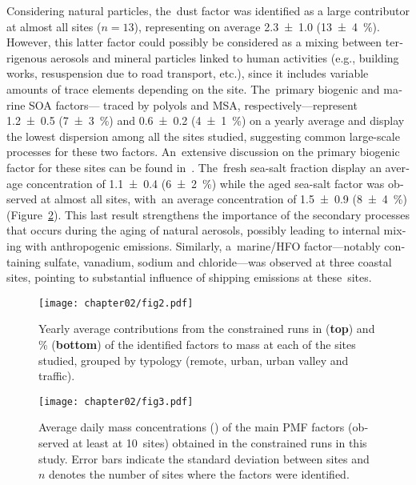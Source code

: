 \begin{otherlanguage}{english}
Considering natural particles, the~dust factor was identified as a large contributor at
almost all sites ($n=13$), representing on average \SI{2.3\pm1.0}{\concum}
(\SI{13\pm4}{\percent}). However, this latter factor could possibly be considered as a
mixing between terrigenous aerosols and mineral particles linked to human activities
(e.g., building works, resuspension due to road transport, etc.), since it includes
variable amounts of trace elements depending on the site. The~primary biogenic and marine
SOA factors--- traced by polyols and MSA, respectively---represent \SI{1.2\pm0.5}{\concum}
(\SI{7\pm3}{\%}) and \SI{0.6\pm0.2}{\concum} (\SI{4\pm1}{\%}) on a yearly average and
display the lowest dispersion among all the sites studied, suggesting common large-scale
processes for these two factors. An~extensive discussion on the primary biogenic factor
for these sites can be found in~\textcite{samakePolyols2019}.  The~fresh sea-salt fraction
display an average concentration of \SI{1.1\pm0.4}{\concum} (\SI{6\pm2}{\%}) while the
aged sea-salt factor was observed at almost all sites, with~an average concentration of
\SI{1.5\pm0.9}{\concum} (\SI{8\pm4}{\%}) (Figure~\ref{fig:fig3}). This last result
strengthens the importance of the secondary processes that occurs during the aging of
natural aerosols, possibly leading to internal mixing with anthropogenic emissions.
Similarly, a~marine/HFO factor---notably containing sulfate, vanadium, sodium and
chloride---was observed at three coastal sites, pointing   to substantial influence of
shipping emissions at these~sites. 

\begin{figure}[ht]
    \centering
    \texttt{[image: chapter02/fig2.pdf]}
    \caption{Yearly average contributions from the constrained runs in
        \si{\concum} (\textbf{top}) and \si{\percent} (\textbf{bottom}) of the identified factors to
        \PM{} mass at each of the sites studied, grouped by typology (remote, urban,
urban valley and traffic).} 
\label{fig:fig2}
\end{figure}

\begin{figure}[ht]
    \centering
    \texttt{[image: chapter02/fig3.pdf]}
    \caption{Average daily mass concentrations (\si{\concum}) of the main PMF factors
        (observed at least at 10~sites) obtained in the constrained runs in
        this study. Error bars indicate the standard deviation between sites
        and $n$ denotes the number of sites where the factors were identified.}
    \label{fig:fig3}
\end{figure}



\end{otherlanguage}
